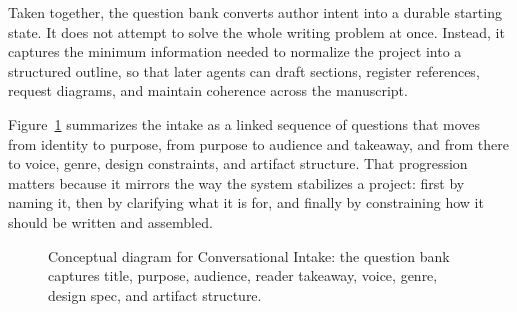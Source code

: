 \documentclass[11pt]{article}
\begin{document}
Taken together, the question bank converts author intent into a durable starting state. It does not attempt to solve the whole writing problem at once. Instead, it captures the minimum information needed to normalize the project into a structured outline, so that later agents can draft sections, register references, request diagrams, and maintain coherence across the manuscript.

Figure~\ref{fig:ch03_sec01_conversation_intake} summarizes the intake as a linked sequence of questions that moves from identity to purpose, from purpose to audience and takeaway, and from there to voice, genre, design constraints, and artifact structure. That progression matters because it mirrors the way the system stabilizes a project: first by naming it, then by clarifying what it is for, and finally by constraining how it should be written and assembled.

\begin{figure}[htbp]
\centering

\caption{Conceptual diagram for Conversational Intake: the question bank captures title, purpose, audience, reader takeaway, voice, genre, design spec, and artifact structure.}
\label{fig:ch03_sec01_conversation_intake}
\end{figure}
\end{document}
